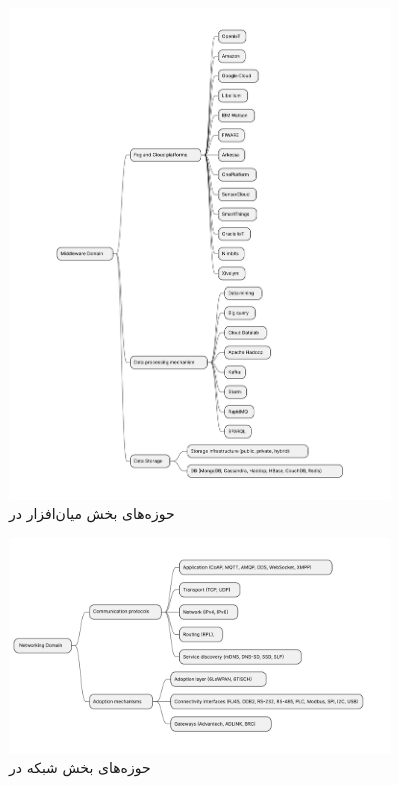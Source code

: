 \documentclass[a4paper]{article}
\begin{document}
\begin{figure}[H]
  \centering
  \includegraphics[width=0.9\textwidth]{./figures/IoT_middleware_domains.pdf}
  \caption{حوزه‌های بخش میان‌افزار در }
  \label{fig:iotMiddlewareDomains}
\end{figure}

\begin{figure}[H]
  \centering
  \includegraphics[width=0.9\textwidth]{./figures/IoT_network_domains.pdf}
  \caption{حوزه‌های بخش شبکه در }
  \label{fig:iotNetworkingDomains}
\end{figure}
\end{document}
